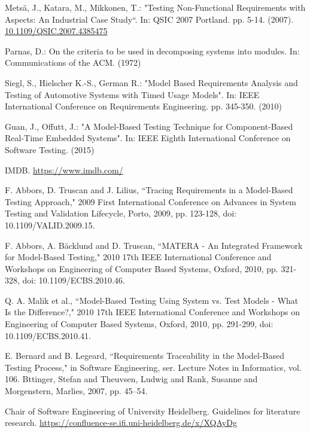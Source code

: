 \documentclass[a4paper,10pt, bibliography=totocnumbered]{scrreprt}
\begin{document}
\begin{thebibliography}{9}
 Metsä, J., Katara, M., Mikkonen, T.: "Testing Non-Functional Requirements with Aspects: An Industrial Case Study“.
In:  QSIC 2007 Portland. pp. 5-14. (2007). \url{10.1109/QSIC.2007.4385475}

 Parnas, D.: On the criteria to be used in decomposing systems into modules.
In: Communications of the ACM. (1972)



 Siegl, S., Hielscher K.-S., German R.: "Model Based Requirements Analysis and Testing of Automotive Systems with Timed Usage Models". In: IEEE International Conference on Requirements Engineering. pp. 345-350. (2010)

 Guan, J., Offutt, J.: "A Model-Based Testing Technique for Component-Based Real-Time Embedded Systems". In: IEEE Eighth International Conference on Software Testing. (2015)

 IMDB. \url{https://www.imdb.com/}




 F. Abbors, D. Truscan and J. Lilius, “Tracing Requirements in a Model-Based Testing Approach," 2009 First International Conference on Advances in System Testing and Validation Lifecycle, Porto, 2009, pp. 123-128, doi: 10.1109/VALID.2009.15.

 F. Abbors, A. Bäcklund and D. Truscan, “MATERA - An Integrated Framework for Model-Based Testing," 2010 17th IEEE International Conference and Workshops on Engineering of Computer Based Systems, Oxford, 2010, pp. 321-328, doi: 10.1109/ECBS.2010.46.

 Q. A. Malik et al., “Model-Based Testing Using System vs. Test Models - What Is the Difference?," 2010 17th IEEE International Conference and Workshops on Engineering of Computer Based Systems, Oxford, 2010, pp. 291-299, doi: 10.1109/ECBS.2010.41.

 E. Bernard and B. Legeard, “Requirements Traceability in the Model-Based Testing Process,"  in Software Engineering, ser. Lecture Notes in Informatics, vol. 106. Bttinger, Stefan and Theuvsen, Ludwig and Rank, Susanne and Morgenstern, Marlies, 2007, pp. 45–54.

 Chair of Software Engineering of University Heidelberg. Guidelines for literature research.
\url{https://confluence-se.ifi.uni-heidelberg.de/x/XQAyDg}


\end{thebibliography}
\end{document}
